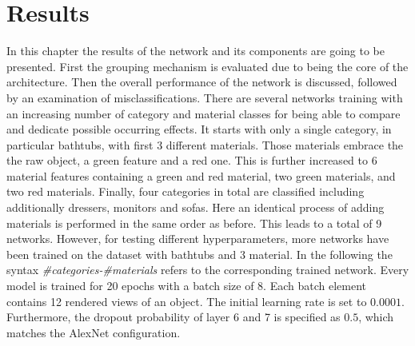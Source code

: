 \chapter{Results}
In this chapter the results of the network and its components are going to be presented.
First the grouping mechanism is evaluated due to being the core of the architecture.
Then the overall performance of the network is discussed, followed by an examination of misclassifications.
There are several networks training with an increasing number of category and material classes for being able to compare and dedicate possible occurring effects.
It starts with only a single category, in particular bathtubs, with first 3 different materials.
Those materials embrace the the raw object, a green feature and a red one.
This is further increased to 6 material features containing a green and red material, two green materials, and two red materials.
Finally, four categories in total are classified including additionally dressers, monitors and sofas.
Here an identical process of adding materials is performed in the same order as before.
This leads to a total of 9 networks.
However, for testing different hyperparameters, more networks have been trained on the dataset with bathtubs and 3 material.
In the following the syntax \emph{\#categories-\#materials} refers to the corresponding trained network.
Every model is trained for 20 epochs with a batch size of 8.
Each batch element contains 12 rendered views of an object.
The initial learning rate is set to $0.0001$.
Furthermore, the dropout probability of layer 6 and 7 is specified as $0.5$, which matches the AlexNet configuration.



